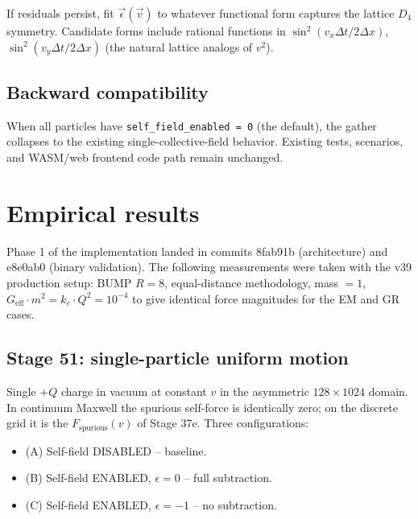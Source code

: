 \documentclass[11pt,a4paper]{article}
\begin{document}
If residuals persist, fit $\vec\epsilon(\vec v)$ to whatever functional form captures the lattice $D_4$ symmetry.  Candidate forms include rational functions in $\sin^2(v_x \Delta t/2 \Delta x)$, $\sin^2(v_y \Delta t/2 \Delta x)$ (the natural lattice analogs of $v^2$).

\subsection{Backward compatibility}

When all particles have \verb|self_field_enabled = 0| (the default), the gather collapses to the existing single-collective-field behavior.  Existing tests, scenarios, and WASM/web frontend code path remain unchanged.

\section{Empirical results}

Phase 1 of the implementation landed in commits 8fab91b (architecture)
and e8e0ab0 (binary validation).  The following measurements were
taken with the v39 production setup: BUMP $R=8$, equal-distance
methodology, mass $= 1$, $G_{\mathrm{eff}}\cdot m^2 = k_e\cdot Q^2 =
10^{-4}$ to give identical force magnitudes for the EM and GR cases.

\subsection{Stage 51: single-particle uniform motion}

Single $+Q$ charge in vacuum at constant $v$ in the asymmetric
$128 \times 1024$ domain.  In continuum Maxwell the spurious self-force
is identically zero; on the discrete grid it is the $F_{\mathrm{spurious}}(v)$
of Stage 37e.  Three configurations:
\begin{itemize}
  \item (A) Self-field DISABLED -- baseline.
  \item (B) Self-field ENABLED, $\epsilon = 0$ -- full subtraction.
  \item (C) Self-field ENABLED, $\epsilon = -1$ -- no subtraction.
\end{itemize}
\end{document}
